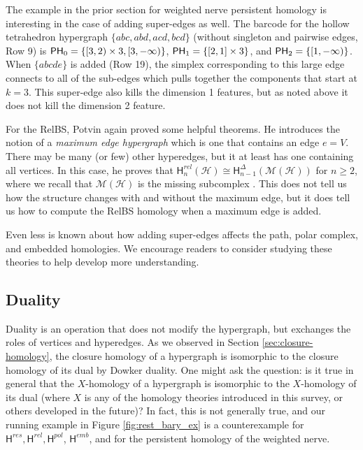 \documentclass{amsart}
\newcommand{\Hgroup}	     {\mathsf{H}}
\newcommand{\PH}	     {\mm{\mathsf{PH}}}
\renewcommand{\hom}[2]{\Hgroup_{#2}^{#1}}
\renewcommand{\H}{\mathcal{H}}
\newcommand{\missing}{\mathcal{M}}
\newcommand {\mm}[1]        {\ifmmode{#1}\else{\mbox{\(#1\)}}\fi}
\begin{document}
The example in the prior section for weighted nerve persistent homology is interesting in the case of adding super-edges as well. The barcode for the hollow tetrahedron hypergraph $\{abc, abd, acd, bcd\}$ (without singleton and pairwise edges, Row 9) is $\PH_0=\{[3,2)\times 3, [3,-\infty)\}$, $\PH_1=\{[2,1] \times 3\}$, and $\PH_2=\{[1,-\infty)\}$. When $\{abcde\}$ is added (Row 19), the simplex corresponding to this large edge connects to all of the sub-edges which pulls together the components that start at $k=3$. This super-edge also kills the dimension 1 features, but as noted above it does not kill the dimension 2 feature. 

For the RelBS, Potvin again proved some helpful theorems. He introduces the notion of a \emph{maximum edge hypergraph} which is one that contains an edge $e=V$. There may be many (or few) other hyperedges, but it at least has one containing all vertices. In this case, he proves that $\hom{rel}{n}(\H) \cong \hom{\Delta}{n-1}(\missing(\H))$ for $n \geq 2$, where we recall that $\missing(\H)$ is the missing subcomplex \cite[Theorem 4.2.3]{potvin2023hypergraphs}. This does not tell us how the structure changes with and without the maximum edge, but it does tell us how to compute the RelBS homology when a maximum edge is added.

Even less is known about how adding super-edges affects the path, polar complex, and embedded homologies. We encourage readers to consider studying these theories to help develop more understanding.

\subsection{Duality}
Duality is an operation that does not modify the hypergraph, but exchanges the roles of vertices and hyperedges. As we observed in Section \ref{sec:closure-homology}, the closure homology of a hypergraph is isomorphic to the closure homology of its dual by Dowker duality. One might ask the question: is it true in general that the $X$-homology of a hypergraph is isomorphic to the $X$-homology of its dual (where $X$ is any of the homology theories introduced in this survey, or others developed in the future)? In fact, this is not generally true, and our running example in Figure \ref{fig:rest_bary_ex} is a counterexample for $\hom{res}{}, \hom{rel}{}, \hom{pol}{}$, $\hom{emb}{}$, and for the persistent homology of the weighted nerve.
\end{document}
